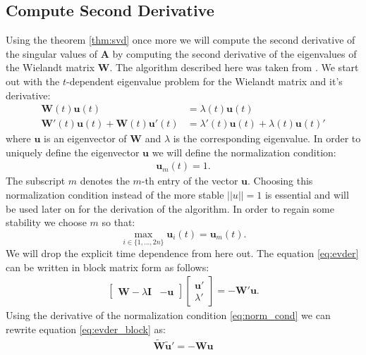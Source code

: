 \documentclass[a4paper, oneside]{thirdparty_stylesheets/discothesis}
\begin{document}
\subsection{Compute Second Derivative}
Using the theorem \ref{thm:svd} once more we will compute the second derivative of the singular values of $\mathbf{A}$ by computing the second derivative of the eigenvalues of the Wielandt matrix $\mathbf{W}$.
The algorithm described here was taken from \cite{doi:10.1002/nme.1620260202}.
We start out with the $t$-dependent eigenvalue problem for the Wielandt matrix and it's derivative:
\begin{align}
	\mathbf{W}(t)\mathbf{u}(t) &= \lambda(t)\mathbf{u}(t) \\
	\mathbf{W}'(t)\mathbf{u}(t) +
	\mathbf{W}(t)\mathbf{u}'(t) &=
	\lambda'(t)\mathbf{u}(t) +
	\lambda(t)\mathbf{u}(t)' \label{eq:evder}
\end{align}
where $\mathbf{u}$ is an eigenvector of $\mathbf{W}$ and $\lambda$ is the corresponding eigenvalue.
In order to uniquely define the eigenvector $\mathbf{u}$ we will define the normalization condition:
\begin{align}
	\mathbf{u}_m(t) = 1. \label{eq:norm_cond}
\end{align}
The subscript $m$ denotes the $m$-th entry of the vector $\mathbf{u}$.
Choosing this normalization condition instead of the more stable $||u|| = 1$ is essential and will be used later on for the derivation of the algorithm.
In order to regain some stability we choose $m$ so that:
\begin{equation}
	\max_{i \in \{1,...,2n\}} \mathbf{u}_i(t) = \mathbf{u}_m(t).
\end{equation}
We will drop the explicit time dependence from here out.
The equation \ref{eq:evder} can be written in block matrix form as follows:
\begin{align}
	\begin{bmatrix}
		\mathbf{W}-\lambda\mathbf{I} & -\mathbf{u}
	\end{bmatrix}
	\begin{bmatrix}
		\mathbf{u}' \\
		\lambda'
	\end{bmatrix} 
	= - \mathbf{W}'\mathbf{u}. \label{eq:evder_block}
\end{align}
Using the derivative of the normalization condition \ref{eq:norm_cond} we can rewrite equation \ref{eq:evder_block} as:
\begin{align}
	\mathbf{\tilde{W}} \mathbf{\tilde{u}}' = -\mathbf{W}\mathbf{u} \label{eq:firstder}
\end{align}
\end{document}
